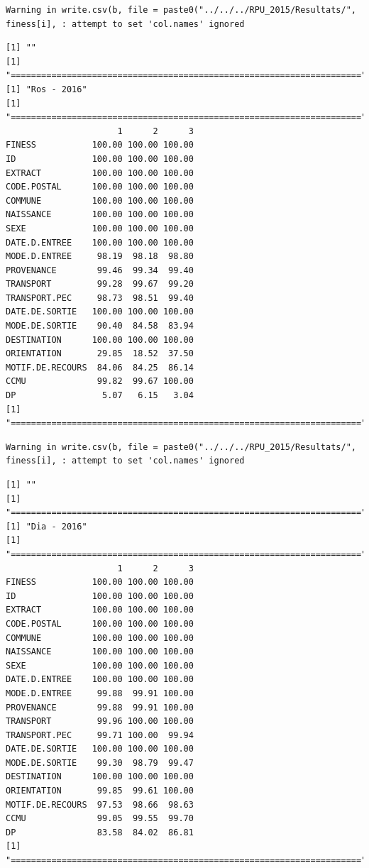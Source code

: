 \documentclass[]{article}
\begin{document}
\begin{verbatim}
Warning in write.csv(b, file = paste0("../../../RPU_2015/Resultats/",
finess[i], : attempt to set 'col.names' ignored
\end{verbatim}

\begin{verbatim}
[1] ""
[1] "====================================================================="
[1] "Ros - 2016"
[1] "====================================================================="
                      1      2      3
FINESS           100.00 100.00 100.00
ID               100.00 100.00 100.00
EXTRACT          100.00 100.00 100.00
CODE.POSTAL      100.00 100.00 100.00
COMMUNE          100.00 100.00 100.00
NAISSANCE        100.00 100.00 100.00
SEXE             100.00 100.00 100.00
DATE.D.ENTREE    100.00 100.00 100.00
MODE.D.ENTREE     98.19  98.18  98.80
PROVENANCE        99.46  99.34  99.40
TRANSPORT         99.28  99.67  99.20
TRANSPORT.PEC     98.73  98.51  99.40
DATE.DE.SORTIE   100.00 100.00 100.00
MODE.DE.SORTIE    90.40  84.58  83.94
DESTINATION      100.00 100.00 100.00
ORIENTATION       29.85  18.52  37.50
MOTIF.DE.RECOURS  84.06  84.25  86.14
CCMU              99.82  99.67 100.00
DP                 5.07   6.15   3.04
[1] "====================================================================="
\end{verbatim}

\begin{verbatim}
Warning in write.csv(b, file = paste0("../../../RPU_2015/Resultats/",
finess[i], : attempt to set 'col.names' ignored
\end{verbatim}

\begin{verbatim}
[1] ""
[1] "====================================================================="
[1] "Dia - 2016"
[1] "====================================================================="
                      1      2      3
FINESS           100.00 100.00 100.00
ID               100.00 100.00 100.00
EXTRACT          100.00 100.00 100.00
CODE.POSTAL      100.00 100.00 100.00
COMMUNE          100.00 100.00 100.00
NAISSANCE        100.00 100.00 100.00
SEXE             100.00 100.00 100.00
DATE.D.ENTREE    100.00 100.00 100.00
MODE.D.ENTREE     99.88  99.91 100.00
PROVENANCE        99.88  99.91 100.00
TRANSPORT         99.96 100.00 100.00
TRANSPORT.PEC     99.71 100.00  99.94
DATE.DE.SORTIE   100.00 100.00 100.00
MODE.DE.SORTIE    99.30  98.79  99.47
DESTINATION      100.00 100.00 100.00
ORIENTATION       99.85  99.61 100.00
MOTIF.DE.RECOURS  97.53  98.66  98.63
CCMU              99.05  99.55  99.70
DP                83.58  84.02  86.81
[1] "====================================================================="
\end{verbatim}
\end{document}
